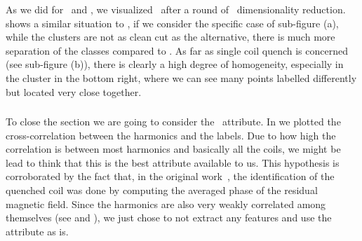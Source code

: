 
As we did for \an\ and \bn, we visualized \cnmod\ after a round of \pca\ dimensionality reduction.
 shows a similar situation to \an, if we consider the specific case of
sub-figure (a), while the clusters are not as clean cut as the alternative, there is much more
separation of the classes compared to \bn. As far as single coil quench is concerned (see sub-figure
(b)), there is clearly a high degree of homogeneity, especially in the cluster in the bottom right,
where we can see many points labelled differently but located very close together.

\subsubsection{\phin}
To close the section we are going to consider the \phin\ attribute. In  we
plotted the cross-correlation between the harmonics and the labels. Due to how high the correlation
is between most harmonics and basically all the coils, we might be lead to think that this is the
best attribute available to us. This hypothesis is corroborated by the fact that, in the original
work~\cite{mariotto2022}, the identification of the quenched coil was done by computing the averaged
phase of the residual magnetic field. Since the harmonics are also very weakly correlated among themselves
(see  and ), we just chose to not extract any features and use the
attribute as is.
